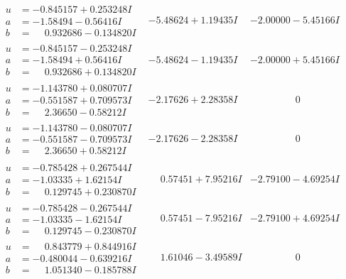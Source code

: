 \documentclass[1p]{elsarticle_modified}
\theoremstyle{definition}
\begin{document}
$$\begin{array}{c|c|c}
\begin{aligned}
u &= -0.845157 + 0.253248 I \\
a &= -1.58494 - 0.56416 I \\
b &= \phantom{-}0.932686 - 0.134820 I\end{aligned}
 & -5.48624 + 1.19435 I & -2.00000 - 5.45166 I \\ \hline\begin{aligned}
u &= -0.845157 - 0.253248 I \\
a &= -1.58494 + 0.56416 I \\
b &= \phantom{-}0.932686 + 0.134820 I\end{aligned}
 & -5.48624 - 1.19435 I & -2.00000 + 5.45166 I \\ \hline\begin{aligned}
u &= -1.143780 + 0.080707 I \\
a &= -0.551587 + 0.709573 I \\
b &= \phantom{-}2.36650 - 0.58212 I\end{aligned}
 & -2.17626 + 2.28358 I & \phantom{-0.000000 } 0 \\ \hline\begin{aligned}
u &= -1.143780 - 0.080707 I \\
a &= -0.551587 - 0.709573 I \\
b &= \phantom{-}2.36650 + 0.58212 I\end{aligned}
 & -2.17626 - 2.28358 I & \phantom{-0.000000 } 0 \\ \hline\begin{aligned}
u &= -0.785428 + 0.267544 I \\
a &= -1.03335 + 1.62154 I \\
b &= \phantom{-}0.129745 + 0.230870 I\end{aligned}
 & \phantom{-}0.57451 + 7.95216 I & -2.79100 - 4.69254 I \\ \hline\begin{aligned}
u &= -0.785428 - 0.267544 I \\
a &= -1.03335 - 1.62154 I \\
b &= \phantom{-}0.129745 - 0.230870 I\end{aligned}
 & \phantom{-}0.57451 - 7.95216 I & -2.79100 + 4.69254 I \\ \hline\begin{aligned}
u &= \phantom{-}0.843779 + 0.844916 I \\
a &= -0.480044 - 0.639216 I \\
b &= \phantom{-}1.051340 - 0.185788 I\end{aligned}
 & \phantom{-}1.61046 - 3.49589 I & \phantom{-0.000000 } 0 \\ \hline\begin{aligned}

\end{aligned}
\end{array}$$
\end{document}
